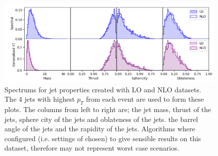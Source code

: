 \begin{figure}[htp]
    \includegraphics[width=\textwidth]{graphics/IRC_singles3}
    \caption{Spectrums for jet properties created with LO and NLO datasets.
             The \(4\) jets with highest \(p_T\) from each event are used to 
             form these plots.
             The columns from left to right are; the jet mass, 
             thrust of the jets, sphere city of the jets and oblateness of the jets.
             the barrel angle of the jets and the rapidity of the jets.
             Algorithms where configured (i.e. settings of \stoppingdeltar{} chosen)
             to give sensible results on
             this dataset, therefore may not represent worst case scenarios.
         }\label{fig:IRC_singles2}

\end{figure}
